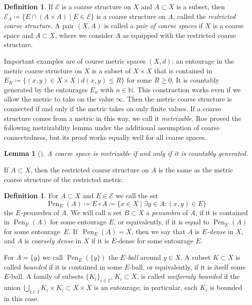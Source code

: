 \documentclass[pdftex]{sigma}
\numberwithin{equation}{section}
\newtheorem{lem}[thm]{Lemma}
\theoremstyle{definition}
\newtheorem{defn}[thm]{Definition}
\newcommand{\N}{\mathbb{N}}
\newcommand{\coarseStr}{\mathcal{E}}
\DeclareMathOperator{\Pen}{Pen}
\begin{document}
\begin{defn}
If $\coarseStr$ is a coarse structure on $X$ and $A\subset X$ is a subset, then
\(\coarseStr_A\coloneqq\{E \cap (A\times A) \mid E\in \coarseStr\}\)
is a coarse structure on $A$, called the \emph{restricted coarse structure}. A pair $(X,A)$ is called a \emph{pair of coarse spaces} if $X$ is a coarse space and $A\subset X$, where we consider $A$ as equipped with the restricted coarse structure.
\end{defn}


Important examples are of course metric spaces $(X,d)$: an entourage in the metric coarse structure on $X$ is a subset of $X\times X$ that is contained in $E_R\coloneqq\{(x,y)\in X\times X\mid d(x,y)\leq R\}$ for some $R\geq 0$.
It is countably generated by the entourages $E_n$ with $n\in\N$.
This construction works even if we allow the metric to take on the value $\infty$.
Then the metric coarse structure is connected if and only if the metric takes on only finite values.
If a coarse structure comes from a metric in this way, we call it \emph{metrizable}.
Roe proved the following metrizability lemma under the additional assumption of coarse connectedness, but its proof works equally well for all coarse spaces.
\begin{lem}[{\cite[Theorem 2.55]{RoeCoarseGeometry}}]\label{lem:metrizability}
A coarse space is metrizable if and only if it is countably generated.
\end{lem}

If $A\subset X$, then the restricted coarse structure on $A$ is the same as the metric coarse structure of the restricted metric.

\begin{defn}For $A\subset X$ and $E\in\coarseStr$ we call the set
\[
\Pen_E(A)\coloneqq E\circ A\coloneqq\{x\in X\mid \exists y\in A\colon (x,y)\in E\}
\]
the \emph{$E$-penumbra} of $A$. We will call a set $B\subset X$ a \emph{penumbra} of $A$, if it is contained in $\Pen_E(A)$ for some entourage $E$, or equivalently, if it is equal to $\Pen_E(A)$ for some entourage~$E$. If~$\Pen_E(A)=X$, then we say that $A$ is \emph{$E$-dense} in $X$, and $A$ is \emph{coarsely dense} in $X$ if it is $E$-dense for some entourage $E$.

For $A=\{y\}$ we call $\Pen_E(\{y\})$ the \emph{$E$-ball} around $y\in X$.
A subset $K\subset X$ is called \emph{bounded} if it is contained in some $E$-ball, or equivalently, if it is itself some $E$-ball.
A family of subsets $\{K_i\}_{i\in I}$, $K_i\subset X$, is called \emph{uniformly bounded} if the union $\bigcup_{i\in I}K_i\times K_i\subset X\times X$ is an entourage; in particular, each $K_i$ is bounded in this case.
\end{defn}
\end{document}
